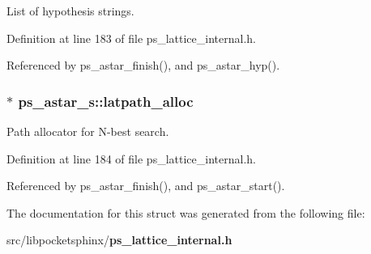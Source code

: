 List of hypothesis strings. 



Definition at line 183 of file ps\-\_\-lattice\-\_\-internal.\-h.



Referenced by ps\-\_\-astar\-\_\-finish(), and ps\-\_\-astar\-\_\-hyp().

\subsubsection[{latpath\-\_\-alloc}]{$\ast$ ps\-\_\-astar\-\_\-s\-::latpath\-\_\-alloc}\label{structps__astar__s_a754bce124cd92b1b2b6aa6dbbcd73cee}


Path allocator for N-\/best search. 



Definition at line 184 of file ps\-\_\-lattice\-\_\-internal.\-h.



Referenced by ps\-\_\-astar\-\_\-finish(), and ps\-\_\-astar\-\_\-start().



The documentation for this struct was generated from the following file\-:\begin{DoxyCompactItemize}
\item 
src/libpocketsphinx/{\bf ps\-\_\-lattice\-\_\-internal.\-h}\end{DoxyCompactItemize}
